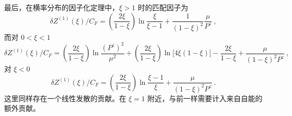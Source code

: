 最后，在横率分布的因子化定理中，$\xi>1$ 时的匹配因子为
\begin{equation}
   \delta Z^{(1)}(\xi)/C_F = \left(\frac{2\xi}{1-\xi}\right)\ln \frac{\xi}{\xi-1} + \frac{1}{(1-\xi)^2}\frac{\mu}{P^z} \ ,
\end{equation}
而对 $0<\xi<1$
\begin{equation}
   \delta Z^{(1)}(\xi)/C_F = \left(\frac{2\xi}{1-\xi}\right)\ln \frac{(P^z)^2}{\mu^2}+\left(\frac{2\xi}{1-\xi}\right)\ln\big[{4\xi(1-\xi)}\big]-\frac{2\xi}{1-\xi} +\frac{\mu}{(1-\xi)^2P^z} \ ,
\end{equation}
对 $\xi<0$
\begin{equation}
   \delta Z^{(1)}(\xi)/C_F = \left(\frac{2\xi}{1-\xi}\right)\ln \frac{\xi-1}{\xi}+\frac{\mu}{(1-\xi)^2P^z} \ .
\end{equation}
这里同样存在一个线性发散的贡献。在 $\xi=1$ 附近，与前一样需要计入来自自能的额外贡献。
